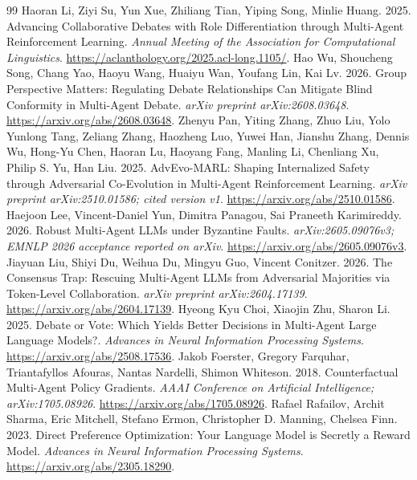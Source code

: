 \documentclass[10pt,twocolumn]{article}
\begin{document}
\begin{thebibliography}{99}
Haoran Li, Ziyi Su, Yun Xue, Zhiliang Tian, Yiping Song, Minlie Huang. 2025. Advancing Collaborative Debates with Role Differentiation through Multi-Agent Reinforcement Learning. \emph{Annual Meeting of the Association for Computational Linguistics}. \url{https://aclanthology.org/2025.acl-long.1105/}.
Hao Wu, Shoucheng Song, Chang Yao, Haoyu Wang, Huaiyu Wan, Youfang Lin, Kai Lv. 2026. Group Perspective Matters: Regulating Debate Relationships Can Mitigate Blind Conformity in Multi-Agent Debate. \emph{arXiv preprint arXiv:2608.03648}. \url{https://arxiv.org/abs/2608.03648}.
Zhenyu Pan, Yiting Zhang, Zhuo Liu, Yolo Yunlong Tang, Zeliang Zhang, Haozheng Luo, Yuwei Han, Jianshu Zhang, Dennis Wu, Hong-Yu Chen, Haoran Lu, Haoyang Fang, Manling Li, Chenliang Xu, Philip S. Yu, Han Liu. 2025. AdvEvo-MARL: Shaping Internalized Safety through Adversarial Co-Evolution in Multi-Agent Reinforcement Learning. \emph{arXiv preprint arXiv:2510.01586; cited version v1}. \url{https://arxiv.org/abs/2510.01586}.
Haejoon Lee, Vincent-Daniel Yun, Dimitra Panagou, Sai Praneeth Karimireddy. 2026. Robust Multi-Agent LLMs under Byzantine Faults. \emph{arXiv:2605.09076v3; EMNLP 2026 acceptance reported on arXiv}. \url{https://arxiv.org/abs/2605.09076v3}.
Jiayuan Liu, Shiyi Du, Weihua Du, Mingyu Guo, Vincent Conitzer. 2026. The Consensus Trap: Rescuing Multi-Agent LLMs from Adversarial Majorities via Token-Level Collaboration. \emph{arXiv preprint arXiv:2604.17139}. \url{https://arxiv.org/abs/2604.17139}.
Hyeong Kyu Choi, Xiaojin Zhu, Sharon Li. 2025. Debate or Vote: Which Yields Better Decisions in Multi-Agent Large Language Models?. \emph{Advances in Neural Information Processing Systems}. \url{https://arxiv.org/abs/2508.17536}.
Jakob Foerster, Gregory Farquhar, Triantafyllos Afouras, Nantas Nardelli, Shimon Whiteson. 2018. Counterfactual Multi-Agent Policy Gradients. \emph{AAAI Conference on Artificial Intelligence; arXiv:1705.08926}. \url{https://arxiv.org/abs/1705.08926}.
Rafael Rafailov, Archit Sharma, Eric Mitchell, Stefano Ermon, Christopher D. Manning, Chelsea Finn. 2023. Direct Preference Optimization: Your Language Model is Secretly a Reward Model. \emph{Advances in Neural Information Processing Systems}. \url{https://arxiv.org/abs/2305.18290}.

\end{thebibliography}
\end{document}

